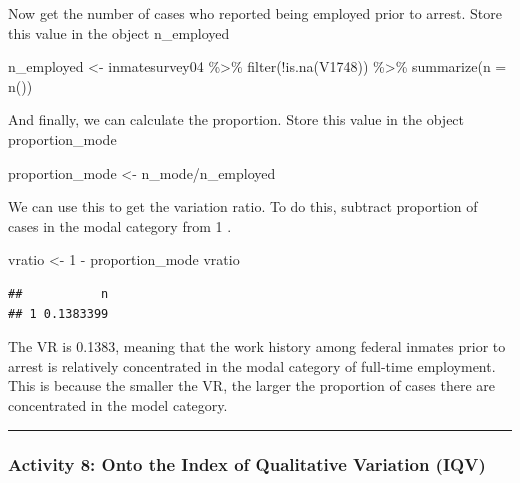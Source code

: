 \documentclass[
]{book}
\newenvironment{Shaded}{\begin{snugshade}}{\end{snugshade}}
\newcommand{\AttributeTok}[1]{\textcolor[rgb]{0.77,0.63,0.00}{#1}}
\newcommand{\DecValTok}[1]{\textcolor[rgb]{0.00,0.00,0.81}{#1}}
\newcommand{\FunctionTok}[1]{\textcolor[rgb]{0.00,0.00,0.00}{#1}}
\newcommand{\NormalTok}[1]{#1}
\newcommand{\OtherTok}[1]{\textcolor[rgb]{0.56,0.35,0.01}{#1}}
\newcommand{\SpecialCharTok}[1]{\textcolor[rgb]{0.00,0.00,0.00}{#1}}
\begin{document}
Now get the number of cases who reported being employed prior to arrest. Store this value in the object n\_employed

\begin{Shaded}
\begin{Highlighting}[]
\NormalTok{n\_employed }\OtherTok{\textless{}{-}}\NormalTok{ inmatesurvey04 }\SpecialCharTok{\%\textgreater{}\%} 
  \FunctionTok{filter}\NormalTok{(}\SpecialCharTok{!}\FunctionTok{is.na}\NormalTok{(V1748)) }\SpecialCharTok{\%\textgreater{}\%} 
  \FunctionTok{summarize}\NormalTok{(}\AttributeTok{n =} \FunctionTok{n}\NormalTok{())}
\end{Highlighting}
\end{Shaded}

And finally, we can calculate the proportion. Store this value in the object proportion\_mode

\begin{Shaded}
\begin{Highlighting}[]
\NormalTok{proportion\_mode }\OtherTok{\textless{}{-}}\NormalTok{ n\_mode}\SpecialCharTok{/}\NormalTok{n\_employed }
\end{Highlighting}
\end{Shaded}

We can use this to get the variation ratio. To do this, subtract proportion of cases in the modal category from 1 .

\begin{Shaded}
\begin{Highlighting}[]
\NormalTok{vratio }\OtherTok{\textless{}{-}} \DecValTok{1} \SpecialCharTok{{-}}\NormalTok{ proportion\_mode}
\NormalTok{vratio}
\end{Highlighting}
\end{Shaded}

\begin{verbatim}
##           n
## 1 0.1383399
\end{verbatim}

The VR is 0.1383, meaning that the work history among federal inmates prior to arrest is relatively concentrated in the modal category of full-time employment. This is because the smaller the VR, the larger the proportion of cases there are concentrated in the model category.

\begin{center}\rule{0.5\linewidth}{0.5pt}\end{center}

\hypertarget{activity-8-onto-the-index-of-qualitative-variation-iqv}{%
\subsubsection{Activity 8: Onto the Index of Qualitative Variation (IQV)}\label{activity-8-onto-the-index-of-qualitative-variation-iqv}}
\end{document}
